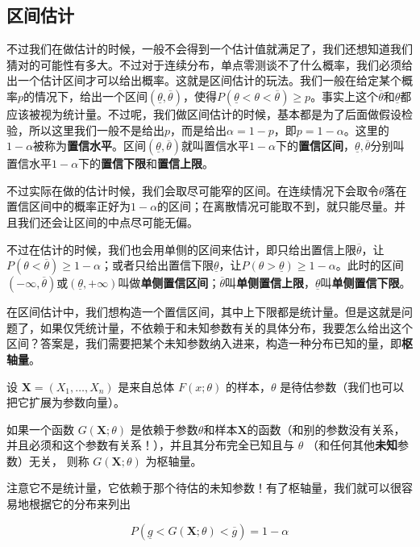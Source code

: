 \subsection{区间估计}
不过我们在做估计的时候，一般不会得到一个估计值就满足了，我们还想知道我们猜对的可能性有多大。不过对于连续分布，单点零测谈不了什么概率，我们必须给出一个估计区间才可以给出概率。这就是区间估计的玩法。我们一般在给定某个概率$p$的情况下，给出一个区间$(\underline{\theta},\overline{\theta})$，使得$P(\underline{\theta}<\theta<\overline{\theta})\geq p$。事实上这个$\overline{\theta}$和$\underline{\theta}$都应该被视为统计量。不过呢，我们做区间估计的时候，基本都是为了后面做假设检验，所以这里我们一般不是给出$p$，而是给出$\alpha=1-p$，即$p=1-\alpha$。这里的$1-\alpha$被称为\textbf{置信水平}。区间$(\underline{\theta},\overline{\theta})$就叫置信水平$1-\alpha$下的\textbf{置信区间}，$\underline{\theta},\overline{\theta}$分别叫置信水平$1-\alpha$下的\textbf{置信下限}和\textbf{置信上限}。

不过实际在做的估计时候，我们会取尽可能窄的区间。在连续情况下会取令$\theta$落在置信区间中的概率正好为$1-\alpha$的区间；在离散情况可能取不到，就只能尽量。并且我们还会让区间的中点尽可能无偏。

不过在估计的时候，我们也会用单侧的区间来估计，即只给出置信上限$\overline{\theta}$，让$P(\theta<\overline{\theta})\geq 1-\alpha$；或者只给出置信下限$\underline{\theta}$，让$P(\theta>\underline{\theta})\geq 1-\alpha$。此时的区间$(-\infty,\overline{\theta})$或$(\underline{\theta},+\infty)$叫做\textbf{单侧置信区间}；$\overline{\theta}$叫\textbf{单侧置信上限}，$\underline{\theta}$叫\textbf{单侧置信下限}。

在区间估计中，我们想构造一个置信区间，其中上下限都是统计量。但是这就是问题了，如果仅凭统计量，不依赖于和未知参数有关的具体分布，我要怎么给出这个区间？答案是，我们需要把某个未知参数纳入进来，构造一种分布已知的量，即\textbf{枢轴量}。

设 $\mathbf{X}=(X_1,\ldots,X_n)$ 是来自总体 $F(x;\theta)$ 的样本，$\theta$ 是待估参数（我们也可以把它扩展为参数向量）。

如果一个函数 $G(\mathbf{X};\theta)$ 是依赖于参数$\theta$和样本$\mathbf{X}$的函数（和别的参数没有关系，并且必须和这个参数有关系！），并且其分布完全已知且与 $\theta$ （和任何其他\textbf{未知}参数）无关，
则称 $G(\mathbf{X};\theta)$ 为枢轴量。

注意它不是统计量，它依赖于那个待估的未知参数！有了枢轴量，我们就可以很容易地根据它的分布来列出

\[
P(\underline{g}<G(\mathbf{X};\theta)<\overline{g}) = 1-\alpha
\]

